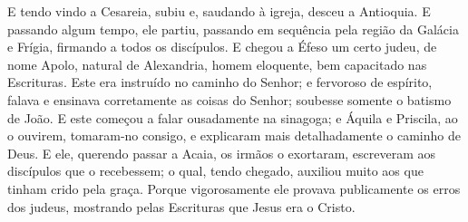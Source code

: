 {  E tendo vindo a Cesareia, subiu e, saudando à igreja, desceu a Antioquia.
  E passando
{} algum tempo, ele partiu, passando em sequência pela região da Galácia e Frígia, firmando a todos os discípulos.
  E chegou a Éfeso um certo judeu, de nome Apolo, natural de Alexandria, homem eloquente, bem capacitado nas Escrituras.
  Este era instruído no caminho do Senhor; e fervoroso de espírito, falava e ensinava corretamente as coisas do Senhor;
{} soubesse somente o batismo de João.
  E este começou a falar ousadamente na sinagoga; e Áquila e Priscila, ao o ouvirem, tomaram-no consigo, e explicaram mais detalhadamente o caminho de Deus.
  E ele, querendo passar a Acaia, os irmãos o exortaram,
{} escreveram aos discípulos que o recebessem; o qual, tendo chegado, auxiliou muito aos que tinham crido pela graça.
  Porque vigorosamente ele provava publicamente os erros dos judeus, mostrando pelas Escrituras que Jesus era o Cristo.
\par }

